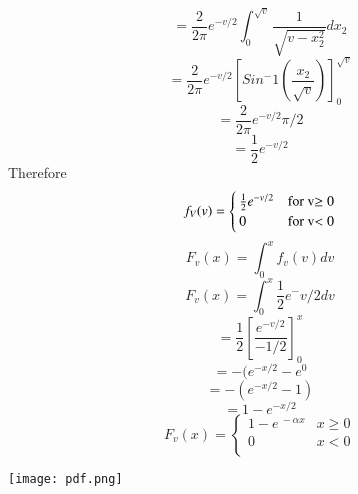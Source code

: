 \documentclass[journal,12pt,twocolumn]{IEEEtran}
\begin{document}
\begin{center}
\begin{equation*}
\begin{split}
  \end{split}  
\end{equation*}
\begin{equation*}
   = \frac{2}{2\pi} e^{-v/2} \int_{0}^{\sqrt{v}} \frac{1}{\sqrt{v-x_2^2}} dx_2
\end{equation*}
\begin{equation*}
    = \frac{2}{2\pi} e^{-v/2} \left[ Sin^-1 \left(\frac{x_2}{\sqrt{v}}\right)\right]_0^\sqrt{v}
\end{equation*}
\begin{equation*}
     = \frac{2}{2\pi} e^{-v/2} \pi/2
\end{equation*}
\begin{equation*}
    = \frac{1}{2} e^{-v/2} 
\end{equation*}
Therefore  
\begin{equation}\label{2.0.4}
  f_V(v)  = \begin{cases}
    \frac{1}{2} e^{-v/2} & $for v$ \geq0 \\
    0  & $for v$ < 0 
    \end{cases}
\end{equation}
\begin{equation*}
    F_v(x) = \int_{0}^{x} f_v(v)dv
\end{equation*}
\begin{equation*}
    F_v(x) = \int_{0}^{x} \frac{1}{2} e^-v/2 dv
\end{equation*}
\begin{equation*}
    = \frac{1}{2} \left[\frac{e^{-v/2}}{-1/2}\right]_0^x
\end{equation*}
\begin{equation*}
    = - (e^{-x/2} - e^0
\end{equation*}
\begin{equation*}
    = -(e^{-x/2} - 1)
\end{equation*}
\begin{equation*}
   = 1-e^{-x/2}  
\end{equation*}
\begin{equation} \label{2.0.5}
    F_{v}(x) =
\begin{cases}
    1-e^{\ -\alpha x} & x\geq0 \\
                                   
    0 & x<0 \\
  \end{cases}
\end{equation}
\begin{center}
    \texttt{[image: pdf.png]}
\end{center}


\end{center}
\end{document}
